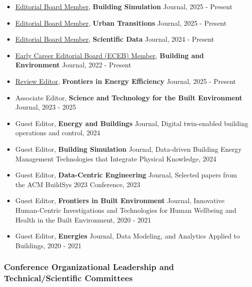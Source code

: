 \documentclass[10pt,a4paper]{article}
\begin{document}
\begin{small}
\begin{itemize}
\item
\href{https://link.springer.com/journal/12273/editorial-board}{Editorial Board Member}, \textbf{Building Simulation} Journal, 2025 - Present
\item
\href{https://www.sciencedirect.com/journal/urban-transitions/about/editorial-board}{Editorial Board Member}, \textbf{Urban Transitions} Journal, 2025 - Present
\item
\href{https://www.nature.com/sdata/}{Editorial Board Member}, \textbf{Scientific Data} Journal, 2024 - Present
\item
\href{https://www.sciencedirect.com/journal/building-and-environment/about/editorial-board}{Early Career Editorial Board (ECEB) Member}, \textbf{Building and Environment} Journal, 2022 - Present
\item
\href{https://www.frontiersin.org/journals/energy-efficiency/editors}{Review Editor}, \textbf{Frontiers in Energy Efficiency} Journal, 2025 - Present
\item
Associate Editor, \textbf{Science and Technology for the Built Environment} Journal, 2023 - 2025
\item
Guest Editor, \textbf{Energy and Buildings} Journal, Digital twin-enabled building operations and control, 2024
\item
Guest Editor, \textbf{Building Simulation} Journal, Data-driven Building Energy Management Technologies that Integrate Physical Knowledge, 2024
\item
Guest Editor, \textbf{Data-Centric Engineering} Journal, Selected papers from the ACM BuildSys 2023 Conference, 2023

\item
Guest Editor, \textbf{Frontiers in Built Environment} Journal, Innovative Human-Centric Investigations and Technologies for Human Wellbeing and Health in the Built Environment, 2020 - 2021
\item
Guest Editor, \textbf{Energies} Journal, Data Modeling, and Analytics Applied to Buildings, 2020 - 2021
\end{itemize}

\subsubsection*{Conference Organizational Leadership and Technical/Scientific Committees}
\begin{itemize}


\end{itemize}
\end{small}
\end{document}

